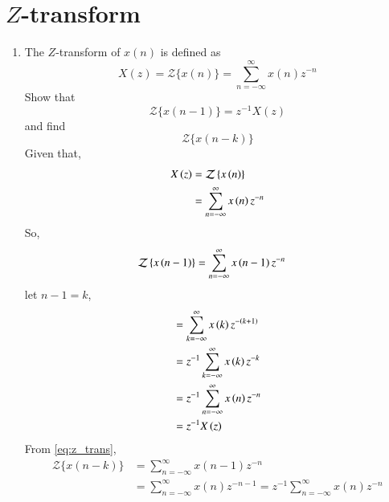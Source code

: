 \documentclass[journal,12pt,twocolumn]{IEEEtran}
\renewcommand\thesection{\arabic{section}}
\begin{document}
\section{$Z$-transform}
\begin{enumerate}[label=\thesection.\arabic*]
     \item The $Z$-transform of $x(n)$ is defined as
           \begin{equation}
                \label{eq:z_trans}
                X(z)={\mathcal {Z}}\{x(n)\}=\sum _{n=-\infty }^{\infty }x(n)z^{-n}
           \end{equation}
           Show that
           \begin{equation}
                \label{eq:shift1}
                {\mathcal {Z}}\{x(n-1)\} = z^{-1}X(z)
           \end{equation}
           and find
           \begin{equation}
                {\mathcal {Z}}\{x(n-k)\}
           \end{equation}
           \solution Given that,
           \begin{align}
                X\left(z\right) & = \mathcal{Z}\left\{x\left(n\right)\right\}               \\
                          & = \sum_{n = -\infty}^{\infty}x\left(n\right)z^{-n}
           \end{align}
           So,
           \begin{align}
                \mathcal{Z}\left\{x\left(n-1\right)\right\} & = \sum_{n=-\infty}^{\infty}x\left(n-1\right)z^{-n}
           \end{align}
           let $n-1 = k$,
           \begin{align}
                 & = \sum_{k=-\infty}^{\infty}x\left(k\right)z^{-\left(k+1\right)} \\
                 & = z^{-1}\sum_{k=-\infty}^{\infty}x\left(k\right)z^{-k}    \\
                 & = z^{-1}\sum_{n=-\infty}^{\infty}x\left(n\right)z^{-n}    \\
                 & = z^{-1}X\left(z\right)
           \end{align}
           From \eqref{eq:z_trans},
           \begin{align}
                {\mathcal {Z}}\{x(n-k)\} & =\sum _{n=-\infty }^{\infty }x(n-1)z^{-n}
                \\
                                         & =\sum _{n=-\infty }^{\infty }x(n)z^{-n-1} = z^{-1}\sum _{n=-\infty }^{\infty }x(n)z^{-n}
           \end{align}

\end{enumerate}
\end{document}
